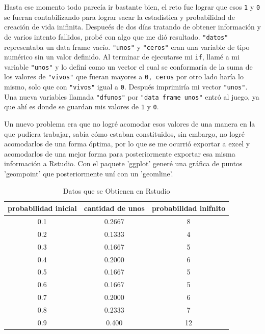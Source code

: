 \documentclass{article}
\begin{document}
Hasta ese momento todo parec\'ia ir bastante bien, el reto fue lograr que esos \texttt{1} y \texttt{0} se fueran contabilizando para lograr sacar la estad\'istica y probabilidad de creaci\'on de vida inifinita.
Despue\'es de dos d\'ias tratando de obtener informaci\'on y de varios intento fallidos, prob\'e con algo que me di\'o resultado.
\texttt{"datos"} representaba un data frame vac\'io.
\texttt{"unos"} y \texttt{"ceros"} eran una variable de tipo num\'erico sin un valor definido. Al terminar de ejecutarse mi \texttt{if}, llam\'e a mi variable \texttt{"unos"} y lo defin\'i como un vector el cual se conformar\'ia de la suma de los valores de \texttt{"vivos"} que fueran mayores a \texttt{0, ceros}  por otro lado har\'ia lo mismo, solo que con \texttt{"vivos"} igual a \texttt{0}.
Despu\'es imprimir\'ia mi vector \texttt{"unos"}.
Una nueva variables llamada \texttt{"dfunos"} por \texttt{"data frame unos"} entr\'o al juego, ya que ah\'i es donde se guardan mis valores de \texttt{1} y \texttt{0}.

Un nuevo problema era que no logr\'e acomodar esos valores de una manera en la que pudiera trabajar, sab\'ia c\'omo estaban constituidos, sin embargo, no logr\'e acomodarlos de una forma \'optima, por lo que se me ocurri\'o exportar a excel y acomodarlos de una mejor forma para posteriormente exportar esa misma informaci\'on a Rstudio\citep{TablasOverleaf}.
Con el paquete 'ggplot' gener\'e una gr\'afica de puntos 'geompoint' que posteriormente un\'i con un 'geomline'.

\begin{table}[ht]
    \centering
    \begin{tabular}{|c|c|c|}
         \hline
         probabilidad inicial & cantidad de unos & probabilidad inifnito\\
         \hline
         0.1 & 0.2667 & 8 \\
         \hline
         0.2 & 0.1333 & 4 \\
         \hline
         0.3 & 0.1667 & 5 \\
         \hline
         0.4 & 0.2000 & 6 \\
         \hline
         0.5 & 0.1667 & 5 \\
         \hline
         0.6 & 0.1667 & 5 \\
         \hline
         0.7 & 0.2000 & 6 \\
         \hline
         0.8 & 0.2333 & 7 \\
         \hline
         0.9 & 0.400 & 12 \\
         \hline
    \end{tabular}
    \caption{Datos que se Obtienen en Rstudio}
    \label{tab:my_label}
\end{table}
\newpage
\end{document}
